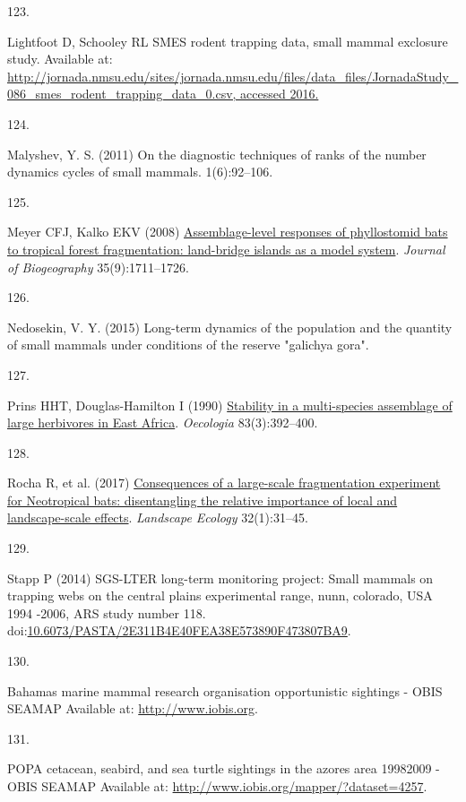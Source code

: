 \documentclass{article}
\newlength{\cslhangindent}
\newlength{\csllabelwidth}
\newlength{\cslentryspacingunit} %
\newenvironment{CSLReferences}[2] %
 {%
  \setlength{\parindent}{0pt}
  \ifodd #1
  \let\oldpar\par
  \def\par{\hangindent=\cslhangindent\oldpar}
  \fi
  \setlength{\parskip}{#2\cslentryspacingunit}
 }%
 {}
\newcommand{\CSLLeftMargin}[1]{\parbox[t]{\csllabelwidth}{#1}}
\newcommand{\CSLRightInline}[1]{\parbox[t]{\linewidth - \csllabelwidth}{#1}\break}
\begin{document}
\begin{CSLReferences}{0}{0}
\leavevmode{}%
\CSLLeftMargin{123. }%
\CSLRightInline{Lightfoot D, Schooley RL SMES rodent trapping data,
small mammal exclosure study. Available at:
\href{http://jornada.nmsu.edu/sites/jornada.nmsu.edu/files/data_files/JornadaStudy_086_smes_rodent_trapping_data_0.csv,\%20accessed\%202016.}{http://jornada.nmsu.edu/sites/jornada.nmsu.edu/files/data\_files/JornadaStudy\_086\_smes\_rodent\_trapping\_data\_0.csv,
accessed 2016.}}

\leavevmode{}%
\CSLLeftMargin{124. }%
\CSLRightInline{Malyshev, Y. S. (2011) On the diagnostic techniques of
ranks of the number dynamics cycles of small mammals. 1(6):92--106.}

\leavevmode{}%
\CSLLeftMargin{125. }%
\CSLRightInline{Meyer CFJ, Kalko EKV (2008)
\href{https://doi.org/10.1111/j.1365-2699.2008.01916.x}{Assemblage-level
responses of phyllostomid bats to tropical forest fragmentation:
land-bridge islands as a model system}. \emph{Journal of Biogeography}
35(9):1711--1726.}

\leavevmode{}%
\CSLLeftMargin{126. }%
\CSLRightInline{Nedosekin, V. Y. (2015) Long-term dynamics of the
population and the quantity of small mammals under conditions of the
reserve {"}galichya gora{"}.}

\leavevmode{}%
\CSLLeftMargin{127. }%
\CSLRightInline{Prins HHT, Douglas-Hamilton I (1990)
\href{https://doi.org/10.1007/BF00317566}{Stability in a multi-species
assemblage of large herbivores in East Africa}. \emph{Oecologia}
83(3):392--400.}

\leavevmode{}%
\CSLLeftMargin{128. }%
\CSLRightInline{Rocha R, et al. (2017)
\href{https://doi.org/10.1007/s10980-016-0425-3}{Consequences of a
large-scale fragmentation experiment for Neotropical bats: disentangling
the relative importance of local and landscape-scale effects}.
\emph{Landscape Ecology} 32(1):31--45.}

\leavevmode{}%
\CSLLeftMargin{129. }%
\CSLRightInline{Stapp P (2014) SGS-LTER long-term monitoring project:
Small mammals on trapping webs on the central plains experimental range,
nunn, colorado, USA 1994 -2006, ARS study number 118.
doi:\href{https://doi.org/10.6073/PASTA/2E311B4E40FEA38E573890F473807BA9}{10.6073/PASTA/2E311B4E40FEA38E573890F473807BA9}.}

\leavevmode{}%
\CSLLeftMargin{130. }%
\CSLRightInline{Bahamas marine mammal research organisation
opportunistic sightings - OBIS SEAMAP Available at:
\url{http://www.iobis.org}.}

\leavevmode{}%
\CSLLeftMargin{131. }%
\CSLRightInline{POPA cetacean, seabird, and sea turtle sightings in the
azores area 1998{\textendash}2009 - OBIS SEAMAP Available at:
\url{http://www.iobis.org/mapper/?dataset=4257}.}

\end{CSLReferences}



\end{document}
